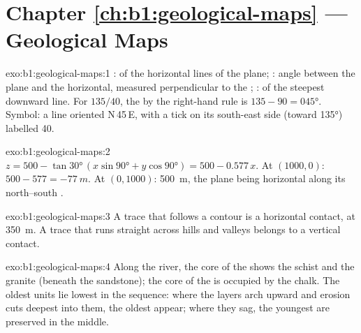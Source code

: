 \section*{Chapter \ref{ch:b1:geological-maps} --- Geological Maps}

\begin{solution}{exo:b1:geological-maps:1}
:  of the horizontal lines of the plane; : angle between the
plane and the horizontal, measured perpendicular to the ; :  of the steepest downward line. For $135/40$, the  by
the right-hand rule is $135 - 90 = \ang{045}$. Symbol: a  line oriented
N\,45\,E, with a tick on its south-east side (toward \ang{135}) labelled 40.
\end{solution}

\begin{solution}{exo:b1:geological-maps:2}
$z = 500 - \tan\ang{30}\,(x\sin\ang{90} + y\cos\ang{90}) = 500 - 0.577\,x$.
At $(1000, 0)$: $500 - 577 = \qty{-77}{m}$. At $(0, 1000)$: \qty{500}{m}, the
plane being horizontal along its north--south .
\end{solution}

\begin{solution}{exo:b1:geological-maps:3}
A trace that follows a contour is a horizontal contact, at \qty{350}{m}. A
trace that runs straight across hills and valleys belongs to a vertical
contact.
\end{solution}

\begin{solution}{exo:b1:geological-maps:4}
Along the river, the core of the  shows the schist and the granite
(beneath the sandstone); the core of the  is occupied by the chalk.
The oldest units lie lowest in the sequence: where the layers arch upward
and erosion cuts deepest into them, the oldest appear; where they sag, the
youngest are preserved in the middle.
\end{solution}

